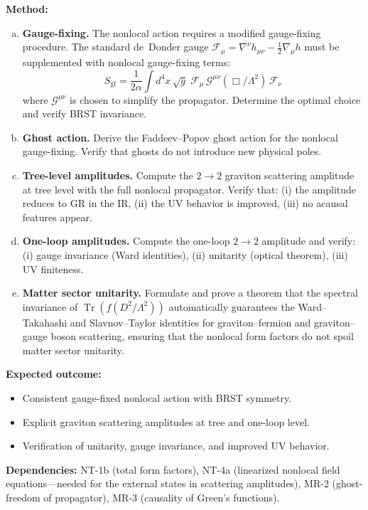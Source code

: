 \documentclass[12pt,a4paper]{article}
\newcommand{\Tr}{\operatorname{Tr}}
\newcommand{\half}{\tfrac{1}{2}}
\newcommand{\method}[1]{\noindent\textbf{Method:} #1\par}
\newcommand{\outcome}[1]{\noindent\textbf{Expected outcome:} #1\par}
\newcommand{\deps}[1]{\noindent\textbf{Dependencies:} #1\par}
\begin{document}
\method{
\begin{enumerate}[(a)]
  \item \textbf{Gauge-fixing.} The nonlocal action requires a modified
    gauge-fixing procedure. The standard de~Donder gauge
    $\mathcal{F}_\mu = \nabla^\nu h_{\mu\nu} - \half\nabla_\mu h$
    must be supplemented with nonlocal gauge-fixing terms:
    \begin{equation}
      S_{\text{gf}} = \frac{1}{2\alpha}\int d^4x\,\sqrt{g}\;
      \mathcal{F}_\mu\,\mathcal{G}^{\mu\nu}(\Box/\Lambda^2)\,\mathcal{F}_\nu
    \end{equation}
    where $\mathcal{G}^{\mu\nu}$ is chosen to simplify the propagator.
    Determine the optimal choice and verify BRST invariance.
  \item \textbf{Ghost action.} Derive the Faddeev--Popov ghost action for
    the nonlocal gauge-fixing. Verify that ghosts do not introduce new
    physical poles.
  \item \textbf{Tree-level amplitudes.} Compute the $2 \to 2$ graviton
    scattering amplitude at tree level with the full nonlocal propagator.
    Verify that: (i) the amplitude reduces to GR in the IR, (ii) the UV
    behavior is improved, (iii) no acausal features appear.
  \item \textbf{One-loop amplitudes.} Compute the one-loop $2 \to 2$
    amplitude and verify: (i) gauge invariance (Ward identities),
    (ii) unitarity (optical theorem), (iii) UV finiteness.
  \item \textbf{Matter sector unitarity.} Formulate and prove a theorem that the spectral
    invariance of $\Tr(f(D^2/\Lambda^2))$ automatically guarantees the Ward--Takahashi
    and Slavnov--Taylor identities for graviton--fermion and graviton--gauge boson scattering,
    ensuring that the nonlocal form factors do not spoil matter sector unitarity.
\end{enumerate}
}

\outcome{
\begin{itemize}
  \item Consistent gauge-fixed nonlocal action with BRST symmetry.
  \item Explicit graviton scattering amplitudes at tree and one-loop level.
  \item Verification of unitarity, gauge invariance, and improved UV behavior.
\end{itemize}
}

\deps{NT-1b (total form factors), NT-4a (linearized nonlocal field equations---needed
for the external states in scattering amplitudes),
MR-2 (ghost-freedom of propagator),
MR-3 (causality of Green's functions).}
\end{document}

